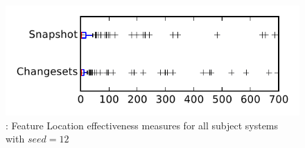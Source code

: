 
\begin{figure}
\centering
\includegraphics[height=0.4\textheight]{figures/flt_seed/rq1_tiny_12}
\caption{\rone: Feature Location effectiveness measures for all subject systems with $seed=12$}
\label{fig:flt_seed:rq1:tiny}
\end{figure}
